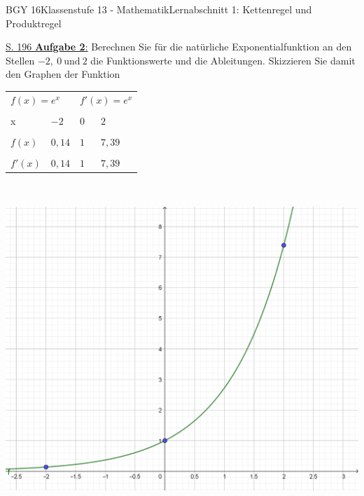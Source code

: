 \documentclass[oneside,openany,headings=optiontotoc,11pt,numbers=noenddot]{scrreprt}
\begin{document}
	\begin{worksheet}{BGY 16}{Klassenstufe 13 - Mathematik}{Lernabschnitt 1: Kettenregel und Produktregel}
				
		\noindent
		\sffamily
		\begin{framed}
			\noindent
			\small{\color{codegray}\underline{S. 196 \textbf{Aufgabe 2}:}} Berechnen Sie für die natürliche Exponentialfunktion an den Stellen \(-2,\ 0\ \text{und}\ 2\) die Funktionswerte und die Ableitungen. Skizzieren Sie damit den Graphen der Funktion\\
			\par\noindent
			\begin{tabularx}{\textwidth}{M|M|M|M}
				 & \\
				& & & \\
				x & \(-2\) & \(0\) & \(2\)\\
				\hline
				& & & \\
				\(f(x)\) & \(0,14\) & \(1\) & \(7,39\)\\
				\hline
				& & & \\
				\(f'(x)\) & \(0,14\) & \(1\) & \(7,39\)\\
			\end{tabularx}\\
			\par\bigskip\noindent
			\includegraphics[width=\textwidth]{../99_Bilder/01_ExpFkt/20180921-2.png}
		\end{framed}
		\newpage
		\begin{framed}

\end{framed}
\end{worksheet}
\end{document}
